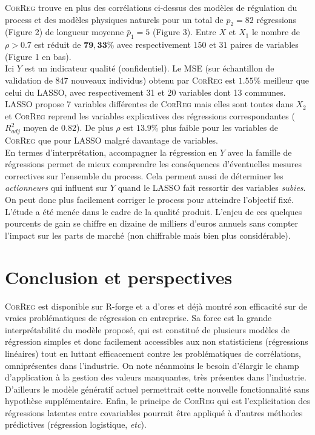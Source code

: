 \documentclass[12pt]{article}
\begin{document}
\textsc{CorReg} trouve  en plus des corrélations ci-dessus des modèles de régulation du process et des modèles physiques naturels pour un total de $p_2=82$ régressions (Figure 2) de longueur moyenne $\bar p_1=5$ (Figure 3). 
Entre $X$ et $X_1$ le nombre de $\rho > 0.7$ est réduit de $\mathbf{79,33\%}$  avec respectivement $150$ et $31$ paires de variables (Figure 1 en bas).
\\
		Ici $Y$ est un indicateur qualité (confidentiel). Le MSE (sur échantillon de validation de 847 nouveaux individus) obtenu par \textsc{CorReg} est $\mathbf{1.55\%}$ meilleur que celui du LASSO, avec respectivement 31 et 20 variables dont 13 communes. LASSO propose 7 variables différentes de  \textsc{CorReg} mais elles sont toutes dans $X_2$ et \textsc{CorReg} reprend les variables explicatives des régressions correspondantes ($R^2_{adj}$ moyen de $0.82$). De plus $\rho$ est $13.9\%$ plus faible pour les variables de \textsc{CorReg} que pour LASSO malgré davantage de variables.
		\\
		En termes d'interprétation, accompagner la régression en $Y$ avec la famille de régressions permet de mieux comprendre les conséquences d'éventuelles mesures correctives sur l'ensemble du process. Cela perment aussi de déterminer les {\it actionneurs } qui influent sur $Y$ quand le LASSO fait ressortir des variables {\it subies}. On peut donc plus facilement corriger le process pour atteindre l'objectif fixé.
		 L'étude a été menée dans le cadre de la qualité produit. L'enjeu de ces quelques pourcents de gain se chiffre en dizaine de milliers d'euros annuels sans compter l'impact sur les parts de marché (non chiffrable mais bien plus considérable).
	


\section{Conclusion et perspectives}\label{secconcl}
	\textsc{CorReg} est disponible sur R-forge et a d'ores et déjà montré son efficacité sur de vraies problématiques de régression en entreprise.
	Sa force est la grande interprétabilité du modèle proposé, qui est constitué de plusieurs modèles de régression simples et donc facilement accessibles aux non statisticiens (régressions linéaires) tout en luttant efficacement contre les problématiques de corrélations, omniprésentes dans l'industrie.
	On note néanmoins le besoin d'élargir le champ d'application à la gestion des valeurs manquantes, très présentes dans l'industrie. D'ailleurs le modèle génératif actuel permettrait cette nouvelle fonctionnalité sans hypothèse supplémentaire. Enfin, le principe de \textsc{CorReg} qui est l'explicitation des régressions latentes entre covariables pourrait être appliqué à d'autres méthodes prédictives (régression logistique, {\it etc}). %
	
\end{document}

